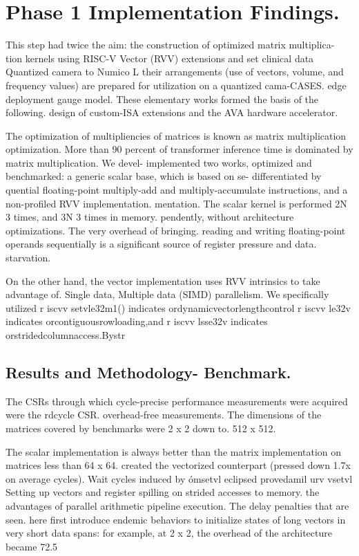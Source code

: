 \chapter{Phase 1 Implementation Findings.}
This step had twice the aim: the construction of optimized matrix multiplica- tion kernels using RISC-V Vector (RVV) extensions and set clinical data Quantized camera to Numico L their arrangements (use of vectors, volume, and frequency values) are prepared for utilization on a quantized cama-CASES. edge deployment gauge model. These elementary works formed the basis of the following. design of custom-ISA extensions and the AVA hardware accelerator.

The optimization of multipliencies of matrices is known as matrix multiplication optimization. More than 90 percent of transformer inference time is dominated by matrix multiplication. We devel- implemented two works, optimized and benchmarked: a generic scalar base, which is based on se- differentiated by quential floating-point multiply-add and multiply-accumulate instructions, and a non-profiled RVV implementation. mentation. The scalar kernel is performed 2N 3 times, and 3N 3 times in memory. pendently, without architecture optimizations. The very overhead of bringing. reading and writing floating-point operands sequentially is a significant source of register pressure and data. starvation.

On the other hand, the vector implementation uses RVV intrinsics to take advantage of. Single data, Multiple data (SIMD) parallelism. We specifically utilized r iscvv setvle32m1() indicates ordynamicvectorlengthcontrol r iscvv le32v indicates orcontiguousrowloading,and r iscvv lsse32v indicates orstridedcolumnaccess.Bystr

\section{Results and Methodology- Benchmark.}
The CSRs through which cycle-precise performance measurements were acquired were the rdcycle CSR. overhead-free measurements. The dimensions of the matrices covered by benchmarks were 2 x 2 down to. 512 x 512.

The scalar implementation is always better than the matrix implementation on matrices less than 64 x 64. created the vectorized counterpart (pressed down 1.7x on average cycles). Wait cycles induced by ómsetvl eclipsed provedamil urv vsetvl Setting up vectors and register spilling on strided accesses to memory. the advantages of parallel arithmetic pipeline execution. The delay penalties that are seen. here first introduce endemic behaviors to initialize states of long vectors in very short data spans: for example, at 2 x 2, the overhead of the architecture became 72.5%

